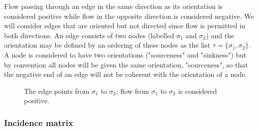 \documentclass[12pt]{article}
\begin{document}
Flow passing through an edge in the same direction as its orientation is considered positive while flow in the opposite direction is considered negative. We will consider edges that are oriented but not directed since flow is permitted in both directions. An edge consists of two nodes (labelled $\sigma_1$ and $\sigma_2$) and the orientation may be defined by an ordering of these nodes as the list $\tau = \{ \sigma_1, \sigma_2 \}$. A node is considered to have two orientations ("sourceness" and "sinkness") but by convention all nodes will be given the same orientation, "sourceness", so that the negative end of an edge will not be coherent with the orientation of a node.   

\begin{figure}
\centering
{} 
\caption{The edge points from $\sigma_1$ to $\sigma_2$; flow from $\sigma_1$ to $\sigma_2$ is considered positive.}
\label{fig:edge_orientation}
\end{figure}

\subsubsection{Incidence matrix}
\end{document}
